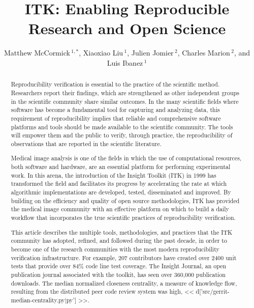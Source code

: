 \documentclass{frontiersENG} %
\def\firstAuthorLast{McCormick {et~al.}} %
\def\Authors{Matthew McCormick\,$^{1,*}$,
  Xiaoxiao Liu\,$^{1}$,
  Julien Jomier\,$^{2}$,
  Charles Marion\,$^{2}$,
  and Luis Ibanez\,$^1$}
\begin{document}
\onecolumn
{}

\title[ITK Reproducible Research]{ITK: Enabling Reproducible Research and Open Science}
\author[\firstAuthorLast ]{\Authors}
\address{}
\correspondance{}
\extraAuth{}%

\maketitle
\begin{abstract}

Reproducibility verification is essential to the practice of the scientific
method. Researchers report their findings, which are strengthened as other
independent groups in the scientific community share similar outcomes.  In the
many scientific fields where software has become a fundamental tool for
capturing and analyzing data, this requirement of reproducibility implies that
reliable and comprehensive software platforms and tools should be made
available to the scientific community. The tools will empower them and the public to
verify, through practice, the reproducibility of observations that are reported in
the scientific literature.

Medical image analysis is one of the fields in which the use of computational
resources, both software and hardware, are an essential platform for performing
experimental work. In this arena, the introduction of the Insight Toolkit (ITK)
in 1999 has transformed the field and facilitates its progress by accelerating
the rate at which algorithmic implementations are developed, tested,
disseminated and improved. By building on the efficiency and quality of open
source methodologies, ITK has provided the medical image community with an
effective platform on which to build a daily workflow that incorporates the
true scientific practices of reproducibility verification.

This article describes the multiple tools, methodologies, and practices that
the ITK community has adopted, refined, and followed during the past decade, in
order to become one of the research communities with the most modern
reproducibility verification infrastructure.  For example, 207 contributors
have created over 2400 unit tests that provide over 84\% code line test
coverage. The Insight Journal, an open publication journal associated with the
toolkit, has seen over 360,000 publication downloads.  The median normalized
closeness centrality, a measure of knowledge flow, resulting from the
distributed peer code review system was high, << d['src/gerrit-median-centrality.py|py'] >>.


\end{abstract}
\end{document}
